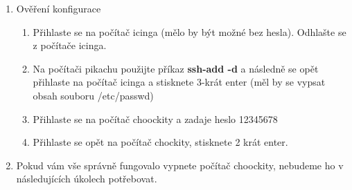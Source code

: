 \begin{enumerate}
\begin{enumerate}
      \item Přidejte váš vygenerovaný klíč pomocí příkazu a zadejte heslo:
        \begin{lstlisting}[language=bash]
            [user@pikachu]# ssh-add ~/.ssh/id_rsa
            Enter passphrase for .ssh/id_rsa:
        \end{lstlisting}
      \item Přihlaste se k serveru icinga. Museli jste zadávat znovu heslo?
    \end{enumerate}
  \item Ověření konfigurace
    \begin{enumerate}
        \item Přihlaste se na počítač icinga (mělo by být možné bez hesla).
          Odhlašte se z počítače icinga.
        \item Na počítači pikachu použijte příkaz \textbf{ssh-add -d} a následně se opět přihlaste na 
        počítač icinga a stisknete 3-krát enter (měl by se vypsat obsah souboru /etc/passwd)
        \item Přihlaste se na počítač choockity a zadaje heslo 12345678
        \item Přihlaste se opět na počítač chockity, stisknete 2 krát enter.
    \end{enumerate}
  \item Pokud vám vše správně fungovalo vypnete počítač choockity, nebudeme ho v následujících úkolech potřebovat.

\end{enumerate}


